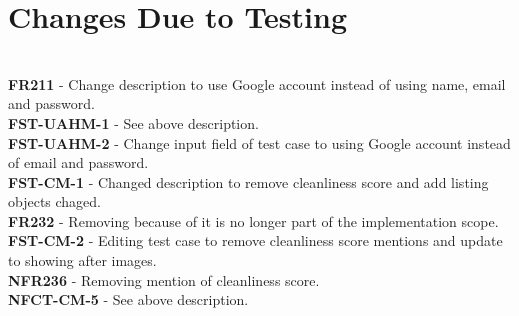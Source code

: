 \documentclass[12pt, titlepage]{article}
\begin{document}
\section{Changes Due to Testing}

\\
\textbf{FR211} - Change description to use Google account instead of using name, email and password.\\
\textbf{FST-UAHM-1} - See above description. \\
\textbf{FST-UAHM-2} - Change input field of test case to using Google account instead of email and password. \\
\textbf{FST-CM-1} - Changed description to remove cleanliness score and add listing objects chaged. \\
\textbf{FR232} - Removing because of it is no longer part of the implementation scope. \\
\textbf{FST-CM-2} - Editing test case to remove cleanliness score mentions and update to showing after images. \\
\textbf{NFR236} - Removing mention of cleanliness score. \\
\textbf{NFCT-CM-5} - See above description. \\
\end{document}
